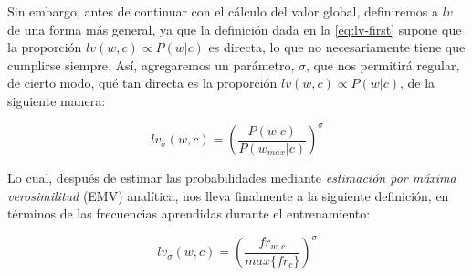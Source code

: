 Sin embargo, antes de continuar con el cálculo del valor global, definiremos a $lv$ de una forma más general, ya que la definición dada en la \autoref{eq:lv-first} supone que la proporción $lv(w, c) \propto P(w|c)$ es directa, lo que no necesariamente tiene que cumplirse siempre. Así, agregaremos un parámetro, $\sigma$, que nos permitirá regular, de cierto modo, qué tan directa es la proporción $lv(w, c) \propto P(w|c)$, de la siguiente manera:

$$lv_\sigma(w, c) = \left(\frac{P(w|c)}{P(w_{max}|c)}\right)^\sigma$$

\vspace{5mm}

Lo cual, después de estimar las probabilidades mediante \emph{estimación por máxima verosimilitud} (EMV) analítica, nos lleva finalmente a la siguiente definición, en términos de las frecuencias aprendidas durante el entrenamiento:

\vspace{5mm}

\begin{equation}
\label{eq:lv-fr}
lv_\sigma(w, c) = \left(\frac{fr_{w,c}}{max\{fr_c\}}\right)^\sigma
\end{equation}

\vspace{5mm}

